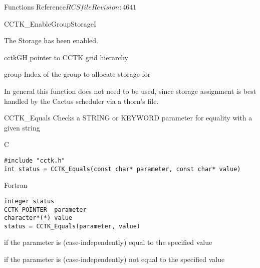 \begin{cactuspart}{ Functions Reference}{$RCSfile$}{$Revision: 4641 $}
\begin{FunctionDescription}{CCTK\_EnableGroupStorageI}
\begin{ResultSection}
\begin{Result}{0}
The Storage has been enabled.
\end{Result}
\end{ResultSection}

\begin{ParameterSection}
\begin{Parameter}{cctkGH}
pointer to CCTK grid hierarchy
\end{Parameter}
\begin{Parameter}{group}
Index of the group to allocate storage for
\end{Parameter}
\end{ParameterSection}

\begin{Discussion}
In general this function does not need to be used, since storage assignment is best handled by
the Cactus scheduler via a thorn's  file.
\end{Discussion}

\end{FunctionDescription}

\begin{FunctionDescription}{CCTK\_Equals}
\label{CCTK-Equals}
Checks a STRING or KEYWORD parameter for equality with a given string

\begin{SynopsisSection}
\begin{Synopsis}{C}
\begin{verbatim}
#include "cctk.h"
int status = CCTK_Equals(const char* parameter, const char* value)
\end{verbatim}
\end{Synopsis}
\begin{Synopsis}{Fortran}
\begin{verbatim}
integer status
CCTK_POINTER  parameter
character*(*) value
status = CCTK_Equals(parameter, value)
\end{verbatim}
\end{Synopsis}
\end{SynopsisSection}

\begin{ResultSection}
\begin{Result}{1}
if the parameter is (case-independently) equal to the specified value
\end{Result}
\begin{Result}{0}
if the parameter is (case-independently) not equal to the specified value
\end{Result}
\end{ResultSection}


\end{FunctionDescription}
\end{cactuspart}
